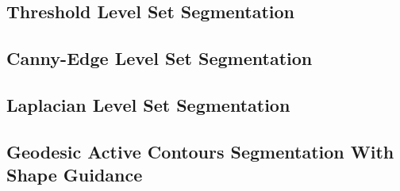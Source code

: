 \ifitkFullVersion

\fi


\subsection{Threshold Level Set Segmentation}
\label{sec:ThresholdSegmentationLevelSetImageFilter}
\ifitkFullVersion

\fi


\subsection{Canny-Edge Level Set Segmentation}
\label{sec:CannySegmentationLevelSetImageFilter}
\ifitkFullVersion

\fi


\subsection{Laplacian Level Set Segmentation}
\label{sec:LaplacianSegmentationLevelSetImageFilter}
\ifitkFullVersion

\fi

\subsection{Geodesic Active Contours Segmentation With Shape Guidance}
\label{sec:GeodesicActiveContourShapePriorLevelSetImageFilter}
\ifitkFullVersion

\fi

